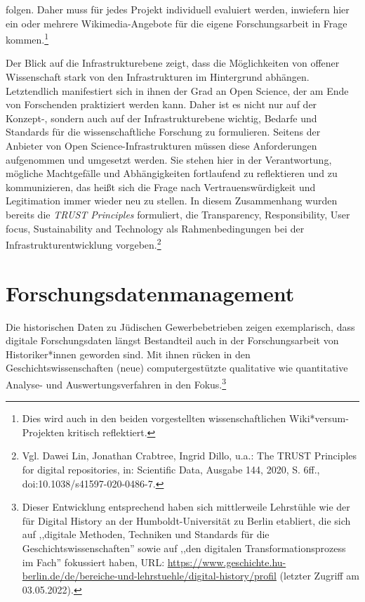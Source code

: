 \begin{enumerate}
folgen. Daher muss für jedes Projekt individuell evaluiert werden, inwiefern hier ein oder mehrere Wikimedia-Angebote für die eigene Forschungsarbeit in Frage kommen.\footnote{Dies wird auch in den beiden vorgestellten wissenschaftlichen Wiki*versum-Projekten kritisch reflektiert.}    
\end{enumerate}

Der Blick auf die Infrastrukturebene zeigt, dass die Möglichkeiten von offener Wissenschaft stark von den Infrastrukturen im Hintergrund abhängen. Letztendlich manifestiert sich in ihnen der Grad an Open Science, der am Ende von Forschenden praktiziert werden kann. Daher ist es nicht nur auf der Konzept-, sondern auch auf der Infrastrukturebene wichtig, Bedarfe und Standards für die wissenschaftliche Forschung zu formulieren. Seitens der Anbieter von Open Science-Infrastrukturen müssen diese Anforderungen aufgenommen und umgesetzt werden. Sie stehen hier in der Verantwortung, mögliche Machtgefälle und Abhängigkeiten fortlaufend zu reflektieren und zu kommunizieren, das heißt sich die Frage nach Vertrauenswürdigkeit und Legitimation immer wieder neu zu stellen. In diesem Zusammenhang wurden bereits die \textit{TRUST Principles} formuliert, die Transparency, Responsibility, User focus, Sustainability and Technology als Rahmenbedingungen bei der Infrastrukturentwicklung vorgeben.\footnote{Vgl. Dawei Lin, Jonathan Crabtree, Ingrid Dillo, u.a.: The TRUST Principles for digital repositories, in: Scientific Data, Ausgabe 144, 2020, S. 6ff., doi:10.1038/s41597-020-0486-7.}

\section{Forschungsdatenmanagement}

Die historischen Daten zu Jüdischen Gewerbebetrieben zeigen exemplarisch, dass digitale Forschungsdaten längst Bestandteil auch in der Forschungsarbeit von Historiker*innen geworden sind. Mit ihnen rücken in den Geschichtswissenschaften (neue) computergestützte qualitative wie quantitative Analyse- und Auswertungsverfahren in den Fokus.\footnote{Dieser Entwicklung entsprechend haben sich mittlerweile Lehrstühle wie der für Digital History an der Humboldt-Universität zu Berlin etabliert, die sich auf ,,digitale Methoden, Techniken und Standards für die Geschichtswissenschaften'' sowie auf ,,den digitalen Transformationsprozess im Fach'' fokussiert haben, URL: \url{https://www.geschichte.hu-berlin.de/de/bereiche-und-lehrstuehle/digital-history/profil} (letzter Zugriff am 03.05.2022).}

